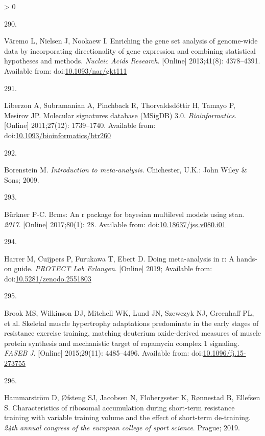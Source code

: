 \documentclass[twoside,10pt]{gihclass} %
\newlength{\cslhangindent}
\newlength{\csllabelwidth}
\newenvironment{CSLReferences}[3] %
 {%
  \setlength{\parindent}{0pt}
  \ifodd #1 \everypar{\setlength{\hangindent}{\cslhangindent}}\ignorespaces\fi
  \ifnum #2 > 0
  \setlength{\parskip}{#2\baselineskip}
  \fi
 }%
 {}
\newcommand{\CSLLeftMargin}[1]{\parbox[t]{\maxof{\widthof{#1}}{\csllabelwidth}}{#1}}
\newcommand{\CSLRightInline}[1]{\parbox[t]{\linewidth}{#1}}
\begin{document}
\begin{CSLReferences}{0}{0}
\leavevmode\hypertarget{ref-RN2891}{}%
\CSLLeftMargin{290. }
\CSLRightInline{Väremo L, Nielsen J, Nookaew I. Enriching the gene set analysis of genome-wide data by incorporating directionality of gene expression and combining statistical hypotheses and methods. \emph{Nucleic Acids Research}. {[}Online{]} 2013;41(8): 4378--4391. Available from: doi:\href{https://doi.org/10.1093/nar/gkt111}{10.1093/nar/gkt111}}

\leavevmode\hypertarget{ref-RN2436}{}%
\CSLLeftMargin{291. }
\CSLRightInline{Liberzon A, Subramanian A, Pinchback R, Thorvaldsdóttir H, Tamayo P, Mesirov JP. Molecular signatures database (MSigDB) 3.0. \emph{Bioinformatics}. {[}Online{]} 2011;27(12): 1739--1740. Available from: doi:\href{https://doi.org/10.1093/bioinformatics/btr260}{10.1093/bioinformatics/btr260}}

\leavevmode\hypertarget{ref-RN2888}{}%
\CSLLeftMargin{292. }
\CSLRightInline{Borenstein M. \emph{Introduction to meta-analysis}. Chichester, U.K.: John Wiley \& Sons; 2009. }

\leavevmode\hypertarget{ref-RN2562}{}%
\CSLLeftMargin{293. }
\CSLRightInline{Bürkner P-C. Brms: An r package for bayesian multilevel models using stan. \emph{2017}. {[}Online{]} 2017;80(1): 28. Available from: doi:\href{https://doi.org/10.18637/jss.v080.i01}{10.18637/jss.v080.i01}}

\leavevmode\hypertarget{ref-harrer2019doing}{}%
\CSLLeftMargin{294. }
\CSLRightInline{Harrer M, Cuijpers P, Furukawa T, Ebert D. Doing meta-analysis in r: A hands-on guide. \emph{PROTECT Lab Erlangen}. {[}Online{]} 2019; Available from: doi:\href{https://doi.org/10.5281/zenodo.2551803}{10.5281/zenodo.2551803}}

\leavevmode\hypertarget{ref-RN1642}{}%
\CSLLeftMargin{295. }
\CSLRightInline{Brook MS, Wilkinson DJ, Mitchell WK, Lund JN, Szewczyk NJ, Greenhaff PL, et al. Skeletal muscle hypertrophy adaptations predominate in the early stages of resistance exercise training, matching deuterium oxide-derived measures of muscle protein synthesis and mechanistic target of rapamycin complex 1 signaling. \emph{FASEB J}. {[}Online{]} 2015;29(11): 4485--4496. Available from: doi:\href{https://doi.org/10.1096/fj.15-273755}{10.1096/fj.15-273755}}

\leavevmode\hypertarget{ref-RN2822}{}%
\CSLLeftMargin{296. }
\CSLRightInline{Hammarström D, Øfsteng SJ, Jacobsen N, Flobergseter K, Rønnestad B, Ellefsen S. Characteristics of ribosomal accumulation during short-term resistance training with variable training volume and the effect of short-term de-training. \emph{24th annual congress of the european college of sport science}. Prague; 2019. }


\end{CSLReferences}
\end{document}

